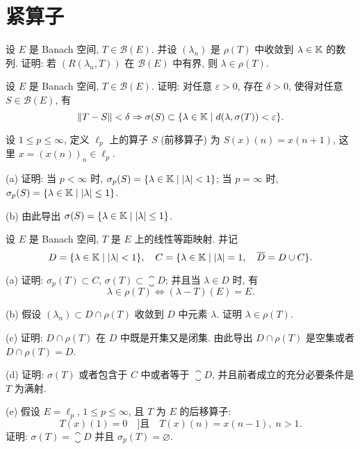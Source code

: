 \setcounter{chapter}{10}
\chapter{紧算子}


\begin{exercise}
    设 $E$ 是 Banach 空间, $T\in\mathcal{B}(E)$.
    并设 $(\lambda_n)$ 是 $\rho(T)$ 中收敛到 $\lambda\in\mathbb{K}$ 的数列.
    证明: 若 $(R(\lambda_n,T))$ 在 $\mathcal{B}(E)$ 中有界, 则 $\lambda\in\rho(T)$.
\end{exercise}



\begin{exercise}
    设 $E$ 是 Banach 空间, $T\in\mathcal{B}(E)$.
    证明: 对任意 $\varepsilon>0$, 存在 $\delta>0$, 使得对任意 $S\in\mathcal{B}(E)$, 有
    \[\|T-S\|<\delta\Rightarrow\sigma(S)\subset\{\lambda\in\mathbb{K}\mid d(\lambda,\sigma(T))<\varepsilon\}.\]
\end{exercise}



\begin{exercise}
    设 $1\leq p\leq\infty$, 定义 $\ell_p$ 上的算子 $S$ (前移算子) 为 $S(x)(n)=x(n+1)$,
    这里 $x=(x(n))_n\in\ell_p$.

    (a) 证明: 当 $p<\infty$ 时, $\sigma_p(S)=\{\lambda\in\mathbb{K}\mid |\lambda|<1\}$;
    当 $p=\infty$ 时, $\sigma_p(S)=\{\lambda\in\mathbb{K}\mid |\lambda|\leq 1\}$.

    (b) 由此导出 $\sigma(S)=\{\lambda\in\mathbb{K}\mid |\lambda|\leq 1\}$.
\end{exercise}



\begin{exercise}
    设 $E$ 是 Banach 空间, $T$ 是 $E$ 上的线性等距映射. 并记
    \[D=\{\lambda\in\mathbb{K}\mid |\lambda|<1\},\quad C=\{\lambda\in\mathbb{K}\mid |\lambda|=1,\quad\overline{D}=D\cup C\}.\]

    (a) 证明: $\sigma_p(T)\subset C$, $\sigma(T)\subset\closure{D}$; 并且当 $\lambda\in D$ 时, 有
    \[\lambda\in\rho(T)\Leftrightarrow (\lambda-T)(E)=E.\]

    (b) 假设 $(\lambda_n)\subset D\cap\rho(T)$ 收敛到 $D$ 中元素 $\lambda$. 证明 $\lambda\in\rho(T)$.

    (c) 证明: $D\cap\rho(T)$ 在 $D$ 中既是开集又是闭集. 由此导出 $D\cap\rho(T)$ 是空集或者 $D\cap\rho(T)=D$.

    (d) 证明: $\sigma(T)$ 或者包含于 $C$ 中或者等于 $\closure{D}$, 并且前者成立的充分必要条件是 $T$ 为满射.

    (e) 假设 $E=\ell_p$, $1\leq p\leq\infty$, 且 $T$ 为 $E$ 的后移算子:
    \[T(x)(1)=0\quad]\text{且}\quad T(x)(n)=x(n-1),\; n>1.\]
    证明: $\sigma(T)=\closure{D}$ 并且 $\sigma_p(T)=\varnothing$.
\end{exercise}



